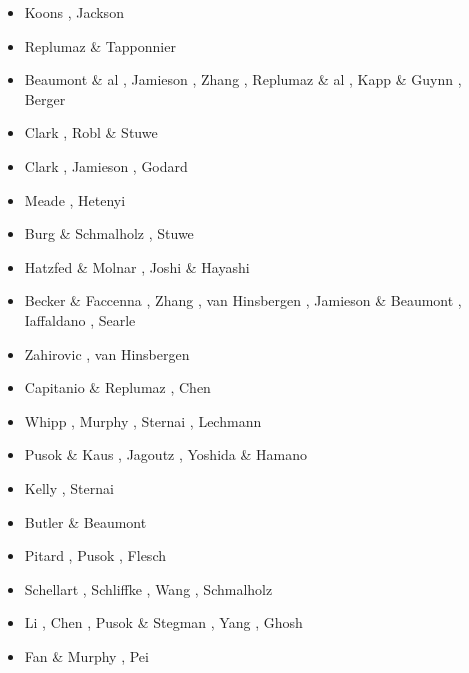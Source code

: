 \begin{itemize}
\begin{scriptsize}
\begin{itemize}
\item[\twothousandtwo] Koons \etal \cite{kozc02}, Jackson \cite{jack02}
\item[\twothousandthree] Replumaz \& Tapponnier \cite{reta03}
\item[\twothousandfour] Beaumont \& al \cite{bejn04}, Jamieson \etal \cite{jabm04}, 
                        Zhang \etal \cite{zhsw04}, Replumaz \& al \cite{rekv04}, 
                        Kapp \& Guynn \cite{kagu04}, Berger \etal \cite{bejh04}
\item[\twothousandfive] Clark \etal \cite{clbr05}, Robl \& Stuwe \cite{rost05a,rost05b}
\item[\twothousandsix] Clark \etal \cite{clrw06}, Jamieson \etal \cite{jabn06}, Godard \etal \cite{golc06}
\item[\twothousandseven] Meade \cite{mead07}, Hetenyi \etal \cite{hecb07}
\item[\twothousandeight] Burg \& Schmalholz \cite{busc08}, Stuwe \etal \cite{strh08}
\item[\twothousandten] Hatzfed \& Molnar \cite{hamo10}, Joshi \& Hayashi \cite{joha10}
\item[\twothousandeleven] Becker \& Faccenna \cite{befa11}, Zhang \etal \cite{zhxy11}, 
                          van Hinsbergen \etal \cite{vasd11}, Jamieson \& Beaumont \cite{jabe11},
                          Iaffaldano \etal \cite{iahb11}, Searle \etal \cite{seep11}
\item[\twothousandtwelve] Zahirovic \etal \cite{zams12}, van Hinsbergen \etal \cite{vald12}
\item[\twothousandthirteen] Capitanio \& Replumaz \cite{care13}, Chen \etal \cite{chgz13,chgz13b}
\item[\twothousandfourteen] Whipp \etal \cite{whbb14}, Murphy \etal \cite{mutg14},
                            Sternai \etal \cite{stjm14}, Lechmann \etal \cite{lesh14}
\item[\twothousandfifteen] Pusok \& Kaus \cite{puka15}, Jagoutz \etal \cite{jarh15}, 
                           Yoshida \& Hamano\cite{yoha15}
\item[\twothousandsixteen] Kelly \etal \cite{kebb16}, Sternai \etal \cite{staj16}
\item[\twothousandseventeen] Butler \& Beaumont \cite{bube17}
\item[\twothousandeighteen] Pitard \etal \cite{pirf18}, Pusok \etal \cite{pukp18}, Flesch \etal \cite{flbb18}
\item[\twothousandnineteen] Schellart \etal \cite{sccs19}, Schliffke \etal \cite{scvm19},
                            Wang \etal \cite{wazg19}, Schmalholz \etal \cite{scdh19}
\item[\twothousandtwenty] Li \etal \cite{livn20}, Chen \etal \cite{chlc20}, 
                          Pusok \& Stegman \cite{pust20}, Yang \etal \cite{yakl20}, 
                          Ghosh \etal \cite{ghbm20}
\item[\twothousandtwentyone] Fan \& Murphy \cite{famu21}, Pei \etal \cite{pels21}
\end{itemize}
\end{scriptsize}


\end{itemize}
